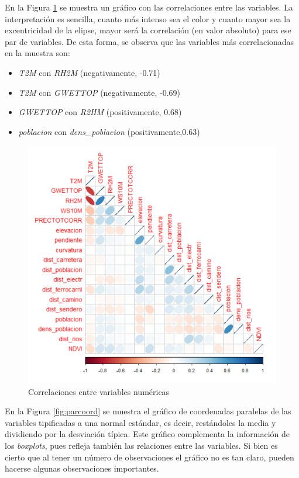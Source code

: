 \documentclass[12pt,a4paper,]{book}
\providecommand{\tightlist}{%
  \setlength{\itemsep}{0pt}\setlength{\parskip}{0pt}}
\numberwithin{dummy}{section}
\theoremstyle{ocrenumbox}
\theoremstyle{blacknumex}
\theoremstyle{blacknumbox}
\theoremstyle{ocrenum}
\theoremstyle{ocrenum}
\begin{document}
En la Figura \ref{fig:corrplot} se muestra un gráfico con las
correlaciones entre las variables. La interpretación es sencilla, cuanto
más intenso sea el color y cuanto mayor sea la excentricidad de la
elipse, mayor será la correlación (en valor absoluto) para ese par de
variables. De esta forma, se observa que las variables más
correlacionadas en la muestra son:

\begin{itemize}
\tightlist
\item
  \emph{T2M} con \emph{RH2M} (negativamente, -0.71)
\item
  \emph{T2M} con \emph{GWETTOP} (negativamente, -0.69)\\
\item
  \emph{GWETTOP} con \emph{R2HM} (positivamente, 0.68)
\item
  \emph{poblacion} con \emph{dens\_poblacion} (positivamente,0.63)
\end{itemize}

\begin{figure}[h]
\centering
\includegraphics[width =\textwidth]{graficos/corrplot.png}
\caption{Correlaciones entre variables numéricas}
\label{fig:corrplot}
\end{figure}

En la Figura \ref{fig:parcoord} se muestra el gráfico de coordenadas
paralelas de las variables tipificadas a una normal estándar, es decir,
restándoles la media y dividiendo por la desviación típica. Este gráfico
complementa la información de los \emph{boxplots}, pues refleja también
las relaciones entre las variables. Si bien es cierto que al tener un
número de observaciones el gráfico no es tan claro, pueden hacerse
algunas observaciones importantes.
\end{document}
